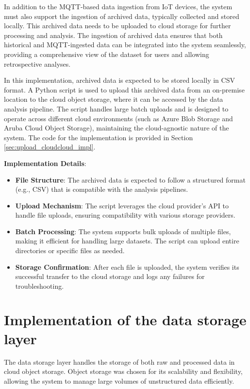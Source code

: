 In addition to the MQTT-based data ingestion from IoT devices, the system must also support the ingestion of archived data, typically collected and stored locally. This archived data needs to be uploaded to cloud storage for further processing and analysis. The ingestion of archived data ensures that both historical and MQTT-ingested data can be integrated into the system seamlessly, providing a comprehensive view of the dataset for users and allowing retrospective analyses.

In this implementation, archived data is expected to be stored locally in CSV format. A Python script is used to upload this archived data from an on-premise location to the cloud object storage, where it can be accessed by the data analysis pipeline. The script handles large batch uploads and is designed to operate across different cloud environments (such as Azure Blob Storage and Aruba Cloud Object Storage), maintaining the cloud-agnostic nature of the system. The code for the implementation is provided in Section \ref{sec:upload_cloudcloud_impl}.

\textbf{Implementation Details}:
\begin{itemize}
    \item \textbf{File Structure}: The archived data is expected to follow a structured format (e.g., CSV) that is compatible with the analysis pipelines.
    \item \textbf{Upload Mechanism}: The script leverages the cloud provider's API to handle file uploads, ensuring compatibility with various storage providers.
    \item \textbf{Batch Processing}: The system supports bulk uploads of multiple files, making it efficient for handling large datasets. The script can upload entire directories or specific files as needed.
    \item \textbf{Storage Confirmation}: After each file is uploaded, the system verifies its successful transfer to the cloud storage and logs any failures for troubleshooting.
\end{itemize}

\section{Implementation of the data storage layer}
\label{sec:implementation_data_storage}

The data storage layer handles the storage of both raw and processed data in cloud object storage. Object storage was chosen for its scalability and flexibility, allowing the system to manage large volumes of unstructured data efficiently.


